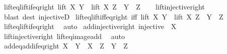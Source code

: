 \begin{isabellebody}
\ lift{\isacharunderscore}{\kern0pt}eq{\isacharunderscore}{\kern0pt}lift{\isacharunderscore}{\kern0pt}if{\isacharunderscore}{\kern0pt}eq{\isacharunderscore}{\kern0pt}right{\isacharcolon}{\kern0pt}\ {\isachardoublequoteopen}lift\ X\ Y\ {\isacharequal}{\kern0pt}\ lift\ X\ Z\ {\isasymLongrightarrow}\ Y\ {\isacharequal}{\kern0pt}\ Z{\isachardoublequoteclose}\isanewline
%
\isadelimproof
\ \ %
\endisadelimproof
%
\isatagproof
{}\isamarkupfalse%
\ lift{\isacharunderscore}{\kern0pt}injective{\isacharunderscore}{\kern0pt}right\ \isamarkupfalse%
\ {\isacharparenleft}{\kern0pt}blast\ dest{\isacharcolon}{\kern0pt}\ injectiveD{\isacharparenright}{\kern0pt}%
\endisatagproof
{\isafoldproof}%
%
\isadelimproof
\isanewline
%
\endisadelimproof
\isanewline
{}\isamarkupfalse%
\ lift{\isacharunderscore}{\kern0pt}eq{\isacharunderscore}{\kern0pt}lift{\isacharunderscore}{\kern0pt}iff{\isacharunderscore}{\kern0pt}eq{\isacharunderscore}{\kern0pt}right\ {\isacharbrackleft}{\kern0pt}iff{\isacharbrackright}{\kern0pt}{\isacharcolon}{\kern0pt}\ {\isachardoublequoteopen}lift\ X\ Y\ {\isacharequal}{\kern0pt}\ lift\ X\ Z\ {\isasymlongleftrightarrow}\ Y\ {\isacharequal}{\kern0pt}\ Z{\isachardoublequoteclose}\isanewline
%
\isadelimproof
\ \ %
\endisadelimproof
%
\isatagproof
{}\isamarkupfalse%
\ lift{\isacharunderscore}{\kern0pt}eq{\isacharunderscore}{\kern0pt}lift{\isacharunderscore}{\kern0pt}if{\isacharunderscore}{\kern0pt}eq{\isacharunderscore}{\kern0pt}right\ \isamarkupfalse%
\ auto%
\endisatagproof
{\isafoldproof}%
%
\isadelimproof
\isanewline
%
\endisadelimproof
\isanewline
{}\isamarkupfalse%
\ add{\isacharunderscore}{\kern0pt}injective{\isacharunderscore}{\kern0pt}right{\isacharcolon}{\kern0pt}\ {\isachardoublequoteopen}injective\ {\isacharparenleft}{\kern0pt}{\isacharparenleft}{\kern0pt}{\isacharplus}{\kern0pt}{\isacharparenright}{\kern0pt}\ X{\isacharparenright}{\kern0pt}{\isachardoublequoteclose}\isanewline
%
\isadelimproof
\ \ %
\endisadelimproof
%
\isatagproof
{}\isamarkupfalse%
\ lift{\isacharunderscore}{\kern0pt}injective{\isacharunderscore}{\kern0pt}right\ lift{\isacharunderscore}{\kern0pt}eq{\isacharunderscore}{\kern0pt}image{\isacharunderscore}{\kern0pt}add\ \isamarkupfalse%
\ auto%
\endisatagproof
{\isafoldproof}%
%
\isadelimproof
\isanewline
%
\endisadelimproof
\isanewline
{}\isamarkupfalse%
\ add{\isacharunderscore}{\kern0pt}eq{\isacharunderscore}{\kern0pt}add{\isacharunderscore}{\kern0pt}if{\isacharunderscore}{\kern0pt}eq{\isacharunderscore}{\kern0pt}right{\isacharcolon}{\kern0pt}\ {\isachardoublequoteopen}X\ {\isacharplus}{\kern0pt}\ Y\ {\isacharequal}{\kern0pt}\ X\ {\isacharplus}{\kern0pt}\ Z\ {\isasymLongrightarrow}\ Y\ {\isacharequal}{\kern0pt}\ Z{\isachardoublequoteclose}\isanewline

\end{isabellebody}
